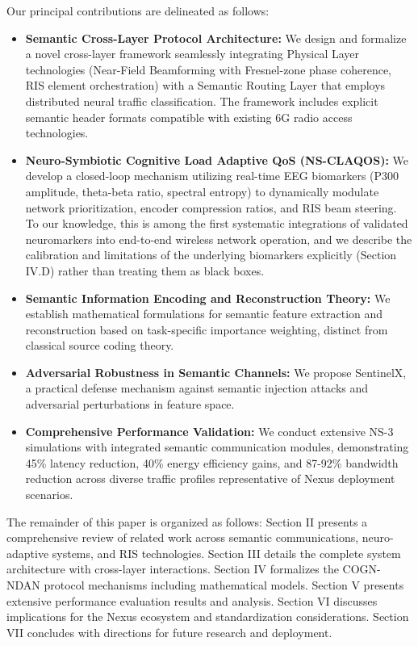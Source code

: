 \documentclass{BVP_CINC}
\newcommand{\COGN}{COGN-NDAN}
\begin{document}
Our principal contributions are delineated as follows:
\begin{itemize}
    \item \textbf{Semantic Cross-Layer Protocol Architecture:} We design and formalize a novel cross-layer framework seamlessly integrating Physical Layer technologies (Near-Field Beamforming with Fresnel-zone phase coherence, RIS element orchestration) with a Semantic Routing Layer that employs distributed neural traffic classification. The framework includes explicit semantic header formats compatible with existing 6G radio access technologies.
    \item \textbf{Neuro-Symbiotic Cognitive Load Adaptive QoS (NS-CLAQOS):} We develop a closed-loop mechanism utilizing real-time EEG biomarkers (P300 amplitude, theta-beta ratio, spectral entropy) to dynamically modulate network prioritization, encoder compression ratios, and RIS beam steering. To our knowledge, this is among the first systematic integrations of validated neuromarkers into end-to-end wireless network operation, and we describe the calibration and limitations of the underlying biomarkers explicitly (Section IV.D) rather than treating them as black boxes.
    \item \textbf{Semantic Information Encoding and Reconstruction Theory:} We establish mathematical formulations for semantic feature extraction and reconstruction based on task-specific importance weighting, distinct from classical source coding theory.
    \item \textbf{Adversarial Robustness in Semantic Channels:} We propose SentinelX, a practical defense mechanism against semantic injection attacks and adversarial perturbations in feature space.
    \item \textbf{Comprehensive Performance Validation:} We conduct extensive NS-3 simulations with integrated semantic communication modules, demonstrating 45\% latency reduction, 40\% energy efficiency gains, and 87-92\% bandwidth reduction across diverse traffic profiles representative of Nexus deployment scenarios.
\end{itemize}

The remainder of this paper is organized as follows: Section II presents a comprehensive review of related work across semantic communications, neuro-adaptive systems, and RIS technologies. Section III details the complete system architecture with cross-layer interactions. Section IV formalizes the \COGN{} protocol mechanisms including mathematical models. Section V presents extensive performance evaluation results and analysis. Section VI discusses implications for the Nexus ecosystem and standardization considerations. Section VII concludes with directions for future research and deployment.
\end{document}
